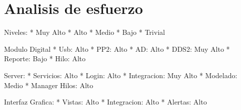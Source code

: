 \section{Analisis de esfuerzo}

Niveles:
    * Muy Alto
    * Alto
    * Medio
    * Bajo
    * Trivial

Modulo Digital
    * Usb: Alto
    * PP2: Alto
    * AD: Alto
    * DDS2: Muy Alto
    * Reporte: Bajo
    * Hilo: Alto

Server:
    * Servicios: Alto
    * Login: Alto
    * Integracion: Muy Alto
    * Modelado: Medio
    * Manager Hilos: Alto

Interfaz Grafica:
    * Vistas: Alto
    * Integracion: Alto
    * Alertas: Alto